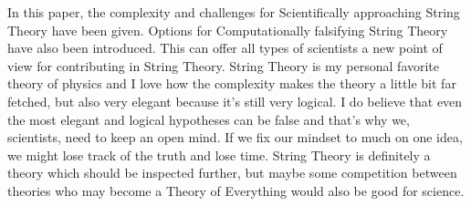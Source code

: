 \documentclass[../paper.tex]{subfiles}
\begin{document}
In this paper, the complexity and challenges for Scientifically approaching String Theory have been given. Options for Computationally falsifying String Theory have also been introduced. This can offer all types of scientists a new point of view for contributing in String Theory. String Theory is my personal favorite theory of physics and I love how the complexity makes the theory a little bit far fetched, but also very elegant because it's still very logical. I do believe that even the most elegant and logical hypotheses can be false and that's why we, scientists, need to keep an open mind. If we fix our mindset to much on one idea, we might lose track of the truth and lose time. String Theory is definitely a theory which should be inspected further, but maybe some competition between theories who may become a Theory of Everything would also be good for science. 
\end{document}
